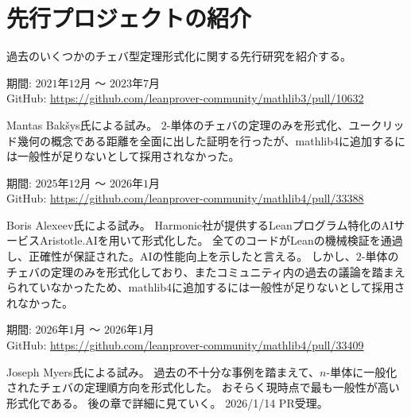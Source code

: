 \documentclass[a4paper,12pt]{bxjsbook}
\newlength{\customindent}
\newenvironment{body}{
  \par
  \begingroup
  \setlength{\leftskip}{\customindent}
  \setlength{\rightskip}{0pt}
  \setlength{\parindent}{1em}
  \setlength{\displayindent}{\customindent}
  \setlength{\displaywidth}{\dimexpr\linewidth-\customindent\relax}
}{
  \par
  \endgroup
}
\theoremstyle{theorem}
\begin{document}
    \section{先行プロジェクトの紹介}
    \begin{body}
        \indent 過去のいくつかのチェバ型定理形式化に関する先行研究を紹介する。

        \begin{bodydescription}
            \item[\hspace*{1.5em}・Lean3時代の形式化]
            期間: $2021$年$12$月 〜 $2023$年$7$月\\
            GitHub: \url{https://github.com/leanprover-community/mathlib3/pull/10632} \cite{mathlib3_ceva}

            Mantas Bakšys氏による試み。
            $2$-単体のチェバの定理のみを形式化、ユークリッド幾何の概念である距離を全面に出した証明を行ったが、mathlib4に追加するには一般性が足りないとして採用されなかった。

            \item[\hspace*{1.5em}・Aristotle.AI（Harmonic社）を用いた形式化]
            期間: $2025$年$12$月 〜 $2026$年$1$月\\
            GitHub: \url{https://github.com/leanprover-community/mathlib4/pull/33388} \cite{mathlib4_ceva_alexeev}

            Boris Alexeev氏による試み。
            Harmonic社が提供するLeanプログラム特化のAIサービスAristotle.AIを用いて形式化した。
            全てのコードがLeanの機械検証を通過し、正確性が保証された。AIの性能向上を示したと言える。
            しかし、$2$-単体のチェバの定理のみを形式化しており、またコミュニティ内の過去の議論を踏まえられていなかったため、mathlib4に追加するには一般性が足りないとして採用されなかった。

            \item[\hspace*{1.5em}・$n$-単体で汎用一般化された初の形式化]
            期間: $2026$年$1$月 〜 $2026$年$1$月\\
            GitHub: \url{https://github.com/leanprover-community/mathlib4/pull/33409} \cite{mathlib4_ceva_myers}

            Joseph Myers氏による試み。
            過去の不十分な事例を踏まえて、$n$-単体に一般化されたチェバの定理順方向を形式化した。
            おそらく現時点で最も一般性が高い形式化である。
            後の章で詳細に見ていく。
            2026/1/14 PR受理。
        \end{bodydescription}

    \end{body}
\end{document}
